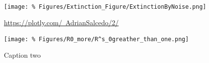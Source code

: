 \begin{figure}[h]
	\centering	
	\texttt{[image: \%
	Figures/Extinction\_Figure/ExtinctionByNoise.png]}
	\caption{%
		\href{https://plotly.com/~AdrianSalcedo/2/}{%
		https://plotly.com/~AdrianSalcedo/2/}}
	\label{fig:ExtinctionByNoise}
\end{figure}
\begin{figure}[h]
	\centering
	\texttt{[image: \%
	Figures/R0\_more/R^s\_0greather\_than\_one.png]}
	\caption{Caption two}
	\label{fig:Rs0GreatherThanOne}
\end{figure}